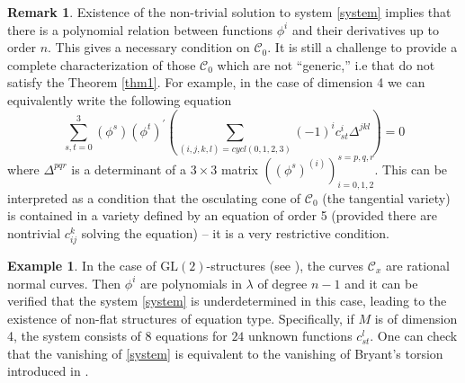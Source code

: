 \documentclass[11pt]{amsart}
\theoremstyle{definition}
\newtheorem{remark}{Remark}
\newtheorem*{example}{Example}
\newcommand{\CC}{\mathcal{C}}
\begin{document}
\begin{remark}
Existence of the non-trivial solution to system \eqref{system} implies that there is a polynomial relation between functions $\phi^i$ and their derivatives up to order $n$. This gives a necessary condition on $\CC_0$. It is still a challenge to provide a complete characterization of those $\CC_0$ which are not ``generic,'' i.e that do not satisfy the Theorem \ref{thm1}. For example, in the case of dimension 4 we can equivalently write the following equation
\[
\sum_{s,t=0}^3(\phi^s)(\phi^t)^{'}\left(\sum_{(i,j,k,l)=cycl(0,1,2,3)}(-1)^ic^i_{st}\Delta^{jkl}\right)=0
\]
where $\Delta^{pqr}$ is a determinant of a $3\times 3$ matrix $((\phi^s)^{(i)})_{i=0,1,2}^{s=p,q,r}$. This can be interpreted as a condition that the osculating cone of $\CC_0$ (the tangential variety) is contained in a variety defined by an equation of order 5 (provided there are nontrivial $c_{ij}^k$ solving the equation) -- it is a very restrictive condition.
\end{remark}

\begin{example}
In the case of $\mathrm{GL}(2)$-structures (see \cite{B,DT,KMet,K1}), the curves $\CC_x$ are rational normal curves. Then $\phi^i$ are polynomials in $\lambda$ of degree $n-1$ and it can be verified that the system \eqref{system} is underdetermined in this case, leading to the existence of non-flat structures of equation type. Specifically, if $M$ is of dimension 4, the system consists of $8$ equations for $24$ unknown functions $c_{st}^l$. One can check that the vanishing of \eqref{system} is equivalent to the vanishing of Bryant's torsion introduced in \cite{B}.
\end{example}
\end{document}
